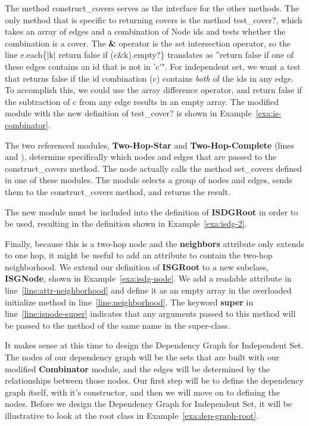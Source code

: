 The method {\ttfamily construct\_covers} serves as the interface for the other methods. The only method that is specific to returning covers is the method {\ttfamily test\_cover?}, which takes an array of edges and a combination of Node ids and tests whether the combination is a cover. The {\bfseries \&} operator is the set intersection operator, so the line {\ttfamily e.each\{|k| return false if (c\&k).empty?\}} translates as ''return false if one of these edges contains an id that is not in 'c'". For independent set, we want a test that returns false if the id combination (c) contains {\em both} of the ids in any edge. To accomplish this, we could use the array difference operator, and return false if the subtraction of c from any edge results in an empty array. The modified module with the new definition of {\ttfamily test\_cover?} is shown in Example~\ref{exa:is-combinator}.  



The two referenced modules, {\bf Two-Hop-Star} and {\bf Two-Hop-Complete} (lines  and ), determine specifically which nodes and edges that are passed to the {\ttfamily construct\_covers} method. The node actually calls the method {\ttfamily set\_covers} defined in one of these modules. The module selects a group of nodes and edges, sends them to the {\ttfamily construct\_covers} method, and returns the result.

The new module must be included into the definition of {\bf ISDGRoot} in order to be used, resulting in the definition shown in Example~\ref{exa:isdg-2}. 

  

Finally, because this is a two-hop node and the {\bf neighbors} attribute only extends to one hop, it might be useful to add an attribute to contain the two-hop neighborhood. We extend our definition of {\bf ISGRoot} to a new subclass, {\bf ISGNode}, shown in Example~\ref{exa:isdg-node}. We add a readable attribute in line~\ref{line:attr-neighborhood} and define it as an empty array in the overloaded {\ttfamily initialize} method in line~\ref{line:neighborhood}. The keyword {\bf super} in line~\ref{line:isnode-super} indicates that any arguments passed to this method will be passed to the method of the same name in the super-class. 

 

It makes sense at this time to design the Dependency Graph for Independent Set. The nodes of our dependency graph will be the sets that are built with our modified {\bfseries Combinator} module, and the edges will be determined by the relationships between those nodes. Our first step will be to define the dependency graph itself, with it's constructor, and then we will move on to defining the nodes. Before we design the Dependency Graph for Independent Set, it will be illustrative to look at the root class in Example~\ref{exa:dep-graph-root}.

